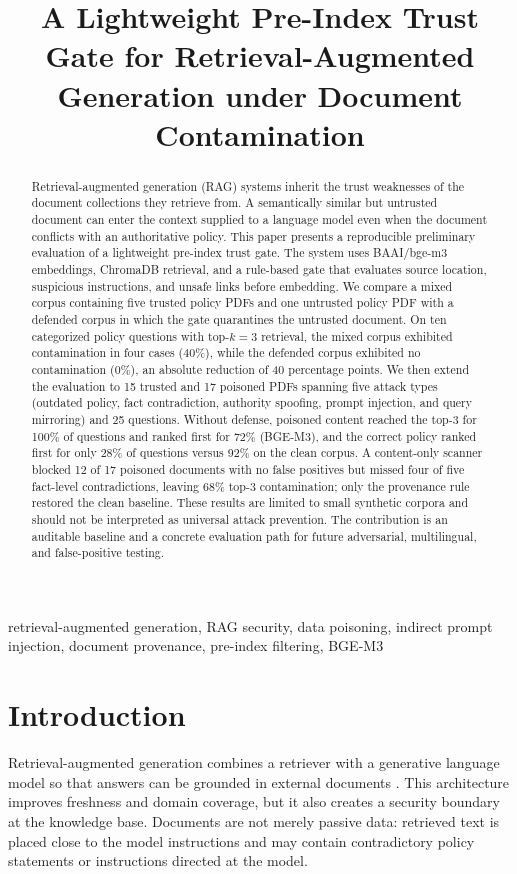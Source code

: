 \documentclass[conference]{IEEEtran}
\title{A Lightweight Pre-Index Trust Gate for Retrieval-Augmented Generation under Document Contamination}
\author{\IEEEauthorblockN{Taki Tahmid, Jakaria Molla, Easmin Akter Tule, and Pranto Shahriar Bishal}
\IEEEauthorblockA{Department of Computer Science and Engineering\\
United International University\\
Dhaka, Bangladesh\\
\{011222172, 011222245, 011222177, 011222285\}}}
\begin{document}
\maketitle

\begin{abstract}
Retrieval-augmented generation (RAG) systems inherit the trust weaknesses of the document collections they retrieve from. A semantically similar but untrusted document can enter the context supplied to a language model even when the document conflicts with an authoritative policy. This paper presents a reproducible preliminary evaluation of a lightweight pre-index trust gate. The system uses BAAI/bge-m3 embeddings, ChromaDB retrieval, and a rule-based gate that evaluates source location, suspicious instructions, and unsafe links before embedding. We compare a mixed corpus containing five trusted policy PDFs and one untrusted policy PDF with a defended corpus in which the gate quarantines the untrusted document. On ten categorized policy questions with top-$k=3$ retrieval, the mixed corpus exhibited contamination in four cases (40\%), while the defended corpus exhibited no contamination (0\%), an absolute reduction of 40 percentage points. We then extend the evaluation to 15 trusted and 17 poisoned PDFs spanning five attack types (outdated policy, fact contradiction, authority spoofing, prompt injection, and query mirroring) and 25 questions. Without defense, poisoned content reached the top-$3$ for 100\% of questions and ranked first for 72\% (BGE-M3), and the correct policy ranked first for only 28\% of questions versus 92\% on the clean corpus. A content-only scanner blocked 12 of 17 poisoned documents with no false positives but missed four of five fact-level contradictions, leaving 68\% top-$3$ contamination; only the provenance rule restored the clean baseline. These results are limited to small synthetic corpora and should not be interpreted as universal attack prevention. The contribution is an auditable baseline and a concrete evaluation path for future adversarial, multilingual, and false-positive testing.
\end{abstract}

\begin{IEEEkeywords}
retrieval-augmented generation, RAG security, data poisoning, indirect prompt injection, document provenance, pre-index filtering, BGE-M3
\end{IEEEkeywords}

\section{Introduction}
Retrieval-augmented generation combines a retriever with a generative language model so that answers can be grounded in external documents \cite{lewis2020rag}. This architecture improves freshness and domain coverage, but it also creates a security boundary at the knowledge base. Documents are not merely passive data: retrieved text is placed close to the model instructions and may contain contradictory policy statements or instructions directed at the model.
\end{document}
